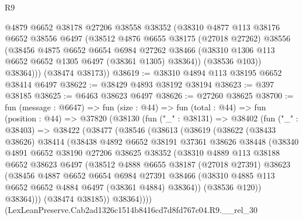 \begin{lexlean}{R9}
\begin{coremodule}
          @4879
          @6652
          @38178
          @27206
          @38558
          @38352
          (@38310
            @4877
            @113
            @38176
            @6652
            @38556
            @6497
            (@38512
              @4876
              @6655
              @38175
              (@27018 @27262)
              @38556
              (@38456
                @4875
                @6652
                @6654
                @6984
                @27262
                @38466
                (@38310 @1306 @113 @6652 @6652 @1305 @6497 (@38361 @1305) @38364))
              (@38536 @103))
            @38364)))
      (@38474 @38173))
@38619 := @38310 @4894 @113 @38195 @6652 @38414 @6497
@38622 := @38429 @4893 @38192 @38194
@38623 := @397 @38185
@38625 := @6463 @38623 @6497
@38626 := @27260 @38625
@38700 := fun (message : @6647) =>
  fun (size : @44) =>
  fun (total : @44) =>
  fun (position : @44) =>
  @37820
    (@38130
      (fun ("_" : @38131) =>
      @38402
        (fun ("_" : @38403) =>
        @38422
          (@38477
            (@38546
              (@38613
                (@38619
                  (@38622
                    (@38433 @38626)
                    @38414
                    (@38438
                      @4892
                      @6652
                      @38191
                      @37361
                      @38626
                      @38448
                      (@38340
                        @4891
                        @6652
                        @38190
                        @27206
                        @38625
                        @38352
                        (@38310
                          @4889
                          @113
                          @38188
                          @6652
                          @38623
                          @6497
                          (@38512
                            @4888
                            @6655
                            @38187
                            (@27018 @27391)
                            @38623
                            (@38456
                              @4887
                              @6652
                              @6654
                              @6984
                              @27391
                              @38466
                              (@38310 @4885 @113 @6652 @6652 @4884 @6497 (@38361 @4884) @38364))
                            (@38536 @120))
                          @38364)))
                    (@38474 @38185))
                  @38364))))
          (LexLeanPreserve.Cab2ad1326c1514b8416cd7d8fd767c04.R9.__rel_30

\end{coremodule}
\end{lexlean}
